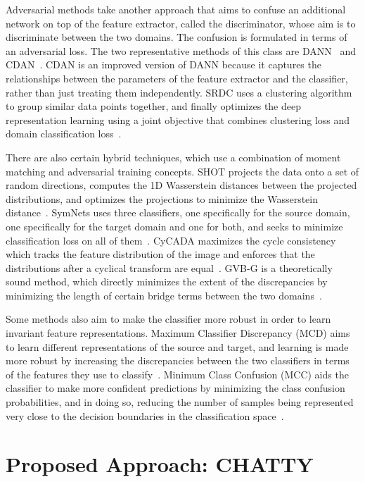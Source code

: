 \documentclass[10pt,twocolumn,letterpaper]{article}
\begin{document}
Adversarial methods take another approach that aims to confuse an additional network on top of the feature extractor, called the discriminator, whose aim is to discriminate between the two domains. The confusion is formulated in terms of an adversarial loss. The two representative methods of this class are DANN~\cite{dann} and CDAN~\cite{cdan}. CDAN is an improved version of DANN because it captures the relationships between the parameters of the feature extractor and the classifier, rather than just treating them independently. SRDC uses a clustering algorithm to group similar data points together, and finally optimizes the deep representation learning using a joint objective that combines clustering loss and domain classification loss~\cite{srdc}. 

There are also certain hybrid techniques, which use a combination of moment matching and adversarial training concepts. SHOT projects the data onto a set of random directions, computes the 1D Wasserstein distances between the projected distributions, and optimizes the projections to minimize the Wasserstein distance~\cite{shot}. SymNets uses three classifiers, one specifically for the source domain, one specifically for the target domain and one for both, and seeks to minimize classification loss on all of them~\cite{symnets}. CyCADA maximizes the cycle consistency which tracks the feature distribution of the image and enforces that the distributions after a cyclical transform are equal~\cite{cycada}. GVB-G is a theoretically sound method, which directly minimizes the extent of the discrepancies by minimizing the length of certain bridge terms between the two domains~\cite{gvb}.  

Some methods also aim to make the classifier more robust in order to learn invariant feature representations. Maximum Classifier Discrepancy (MCD) aims to learn different representations of the source and target, and learning is made more robust by increasing the discrepancies between the two classifiers in terms of the features they use to classify~\cite{mcd}. Minimum Class Confusion (MCC) aids the classifier to make more confident predictions by minimizing the class confusion probabilities, and in doing so, reducing the number of samples being represented very close to the decision boundaries in the classification space~\cite{mcc}. 




\section{Proposed Approach: CHATTY}
\end{document}
